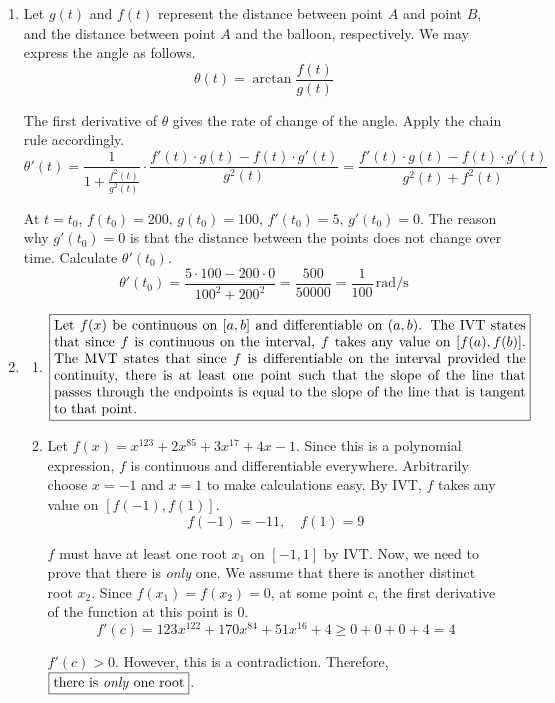 \documentclass[a4paper, 12pt]{article}
\begin{document}
\begin{enumerate}[leftmargin=*,label=\textbf{\arabic*.}]
\newpage

\item Let $g(t)$ and $f(t)$ represent the distance between point $A$ and point $B$, and the distance between point $A$ and the balloon, respectively. We may express the angle as follows.
\[\theta(t)=\arctan{\frac{f(t)}{g(t)}}\]

The first derivative of $\theta$ gives the rate of change of the angle. Apply the chain rule accordingly.
\[\theta'(t)=\frac1{1+\frac{f^2(t)}{g^2(t)}}\cdot\frac{f'(t)\cdot g(t) - f(t) \cdot g'(t)}{g^2(t)}=\frac{f'(t)\cdot g(t) - f(t) \cdot g'(t)}{g^2(t)+f^2(t)}\]

At $t=t_0$, $f(t_0)= 200,\,g(t_0) =100,\,f'(t_0)=5,\,g'(t_0) = 0$. The reason why $g'(t_0) = 0$ is that the distance between the points does not change over time. Calculate $\theta'(t_0)$.
\[\theta'(t_0)=\frac{5\cdot 100 - 200 \cdot 0}{100^2+200^2}=\frac{500}{50000}=\boxed{\frac1{100}\,\mathrm{rad/s}} \]

\item
\begin{enumerate}[leftmargin=*,label=\textbf{\alph*.}]
\item\leavevmode

\vspace{-1.2em}
$\boxed{\parbox{0.98\linewidth}{Let $f(x)$ be continuous on $[a,b]$ and differentiable on $(a,b)$. The IVT states that since $f$ is continuous on the interval, $f$ takes any value on $[f(a),f(b)]$. The MVT states that since $f$ is differentiable on the interval provided the continuity, there is at least one point such that the slope of the line that passes through the endpoints is equal to the slope of the line that is tangent to that point.}}$

\item Let $f(x) = x^{123}+2x^{85} + 3x^{17} + 4x-1$. Since this is a polynomial expression, $f$ is continuous and differentiable everywhere. Arbitrarily choose $x=-1$ and $x=1$ to make calculations easy. By IVT, $f$ takes any value on $[f(-1), f(1)]$.
\[f(-1) = -11,\quad f(1) =9\]

$f$ must have at least one root $x_1$ on $[-1, 1]$ by IVT. Now, we need to prove that there is \textit{only} one. We assume that there is another distinct root $x_2$. Since $f(x_1) = f(x_2) = 0$, at some point $c$, the first derivative of the function at this point is $0$.
\[f'(c) = 123x^{122}+170x^{84} + 51x^{16} + 4 \geq 0+ 0+ 0+ 4 = 4\]

$f'(c)>0$. However, this is a contradiction. Therefore, $\boxed{\text{there is \textit{only} one root}}$.
\end{enumerate}


\end{enumerate}
\end{document}
